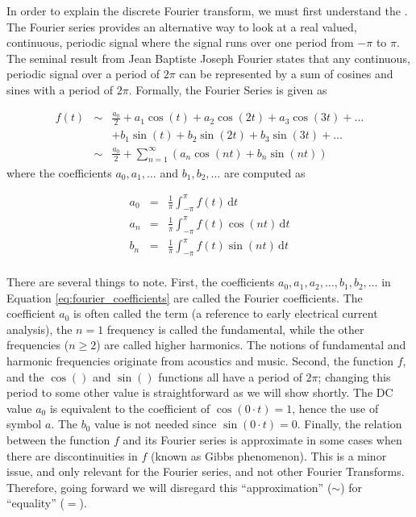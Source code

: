 In order to explain the discrete Fourier transform, we must first understand the . The Fourier series provides an alternative way to look at a real valued, continuous, periodic signal where the signal runs over one period from $-\pi$ to $\pi$. The seminal result from Jean Baptiste Joseph Fourier states that any continuous, periodic signal over a period of $2 \pi$ can be represented by a sum of cosines and sines with a period of $2 \pi$. Formally, the Fourier Series is given as

\begin{equation}
\begin{array} {lcl} 
f(t) & \sim &  \frac{a_0}{2} + a_1 \cos (t) + a_2 \cos (2t) + a_3 \cos (3t) + \dots \\
& & + b_1 \sin(t) + b_2 \sin(2t) + b_3 \sin(3t) + \dots \\
& \sim & \frac{a_0}{2} + \displaystyle\sum\limits_{n=1}^{\infty} (a_n \cos (nt) + b_n \sin(nt))
\end{array}
\label{eq:fourier_series}
\end{equation}
where the coefficients $a_0, a_1, \dots$ and $b_1, b_2, \dots$ are computed as

\begin{equation}
\begin{array} {lcl} 
a_0 & = & \frac{1}{\pi} \int_{-\pi}^\pi f(t)\,\mathrm{d}t \\
a_n & = & \frac{1}{\pi} \int_{-\pi}^\pi f(t) \cos(nt)\,\mathrm{d}t \\
b_n & = & \frac{1}{\pi} \int_{-\pi}^\pi f(t) \sin(nt)\,\mathrm{d}t \\
\end{array}
\label{eq:fourier_coefficients}
\end{equation}

There are several things to note. First, the coefficients $a_0, a_1, a_2, \dots, b_1, b_2, \dots$ in Equation \ref{eq:fourier_coefficients} are called the Fourier coefficients. The coefficient $a_0$ is often called the  term (a reference to early electrical current analysis), the $n=1$ frequency is called the fundamental, while the other frequencies ($n \ge 2$) are called higher harmonics. The notions of fundamental and harmonic frequencies originate from acoustics and music. Second, the function $f$, and the $\cos()$ and $\sin()$ functions all have a period of $2 \pi$; changing this period to some other value is straightforward as we will show shortly. The DC value $a_0$ is equivalent to the coefficient of $\cos (0 \cdot t) = 1$, hence the use of symbol $a$. The $b_0$ value is not needed since $\sin (0 \cdot t) = 0$. Finally, the relation between the function $f$ and its Fourier series is approximate in some cases when there are discontinuities in $f$ (known as Gibbs phenomenon). This is a minor issue, and only relevant for the Fourier series, and not other Fourier Transforms. Therefore, going forward we will disregard this ``approximation'' ($\sim$) for ``equality'' ($=$). 

